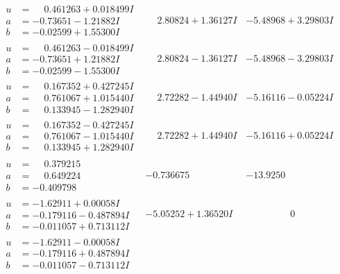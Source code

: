 \documentclass[1p]{elsarticle_modified}
\theoremstyle{definition}
\begin{document}
$$\begin{array}{c|c|c}
\begin{aligned}
u &= \phantom{-}0.461263 + 0.018499 I \\
a &= -0.73651 - 1.21882 I \\
b &= -0.02599 + 1.55300 I\end{aligned}
 & \phantom{-}2.80824 + 1.36127 I & -5.48968 + 3.29803 I \\ \hline\begin{aligned}
u &= \phantom{-}0.461263 - 0.018499 I \\
a &= -0.73651 + 1.21882 I \\
b &= -0.02599 - 1.55300 I\end{aligned}
 & \phantom{-}2.80824 - 1.36127 I & -5.48968 - 3.29803 I \\ \hline\begin{aligned}
u &= \phantom{-}0.167352 + 0.427245 I \\
a &= \phantom{-}0.761067 + 1.015440 I \\
b &= \phantom{-}0.133945 - 1.282940 I\end{aligned}
 & \phantom{-}2.72282 - 1.44940 I & -5.16116 - 0.05224 I \\ \hline\begin{aligned}
u &= \phantom{-}0.167352 - 0.427245 I \\
a &= \phantom{-}0.761067 - 1.015440 I \\
b &= \phantom{-}0.133945 + 1.282940 I\end{aligned}
 & \phantom{-}2.72282 + 1.44940 I & -5.16116 + 0.05224 I \\ \hline\begin{aligned}
u &= \phantom{-}0.379215\phantom{ +0.000000I} \\
a &= \phantom{-}0.649224\phantom{ +0.000000I} \\
b &= -0.409798\phantom{ +0.000000I}\end{aligned}
 & -0.736675\phantom{ +0.000000I} & -13.9250\phantom{ +0.000000I} \\ \hline\begin{aligned}
u &= -1.62911 + 0.00058 I \\
a &= -0.179116 - 0.487894 I \\
b &= -0.011057 + 0.713112 I\end{aligned}
 & -5.05252 + 1.36520 I & \phantom{-0.000000 } 0 \\ \hline\begin{aligned}
u &= -1.62911 - 0.00058 I \\
a &= -0.179116 + 0.487894 I \\
b &= -0.011057 - 0.713112 I\end{aligned}

\end{array}$$
\end{document}
